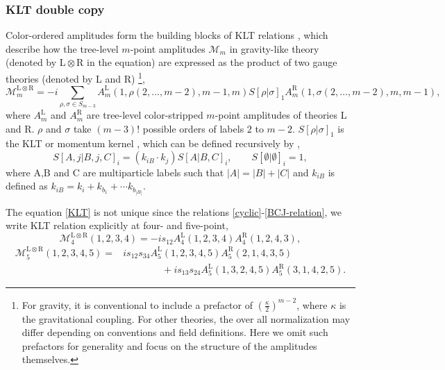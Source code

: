 \documentclass[a4paper,11pt]{article}
\begin{document}
\subsubsection{KLT double copy}
Color-ordered amplitudes form the building blocks of KLT relations \cite{Kawai:1985xq},
which describe how the tree-level $m$-point amplitudes $\mathcal{M}_m$  in gravity-like theory (denoted by $\mathrm L\otimes \mathrm R$ in the equation) are expressed as 
the product of two gauge theories (denoted by L and R)
\footnote{For gravity, it is conventional to include a prefactor of $\left(\frac{\kappa}{2}\right)^{m-2}$, where $\kappa$ is the gravitational coupling. For other theories, the over all normalization may differ depending on conventions and field definitions. 
Here we omit such prefactors for generality and focus on the structure of the amplitudes themselves.}\cite{Bern:1998sv},
\begin{equation}\label{KLT}
    \mathcal{M}_m^{\mathrm{L\otimes R}}=-i\sum_{\rho,\sigma\in S_{m-3}}A_m^{\mathrm L}(1,\rho(2,...,m-2),m-1,m)S[\rho|\sigma]_1 A^{\mathrm R}_m(1,\sigma(2,\dots,m-2),m,m-1),
\end{equation}
where $A^{\mathrm L}_m$ and $A^{\mathrm R}_m$ are tree-level color-stripped $m$-point amplitudes of theories L and R. $\rho$ and $\sigma$ take $(m-3)!$ possible orders of labels $2$ to $m-2$. 
$S[\rho|\sigma]_1$ is the KLT or momentum kernel \cite{Bern:1998sv}, which can be defined recursively by \cite{Carrasco:2016ldy},
\begin{equation}\label{S-kernel}
    S[A,j|B,j,C]_i=(k_{iB}\cdot k_j)S[A|B,C]_i,\qquad S[\emptyset|\emptyset]_i=1,
\end{equation}
where A,B and C are multiparticle labels such that $|A|=|B|+|C|$ and $k_{iB}$ is defined as $k_{iB}=k_i+k_{b_1}+\cdots k_{b_{|B|}}$.\par
The equation \eqref{KLT} is not unique since the relations \eqref{cyclic}-\eqref{BCJ-relation}, we write KLT relation explicitly at four- and five-point,
\begin{equation}
    \mathcal{M}^{\mathrm{L\otimes R}}_4(1,2,3,4)=-is_{12}A^{\mathrm L}_4(1,2,3,4)A^{\mathrm R}_4(1,2,4,3),
\end{equation}
\begin{equation}
    \begin{split}
    \mathcal{M}^{\mathrm{L\otimes R}}_5(1,2,3,4,5)=&is_{12}s_{34}A^{\mathrm L}_5(1,2,3,4,5)A^{\mathrm R}_5(2,1,4,3,5)\\
        &\qquad\qquad+is_{13}s_{24}A_5^{\mathrm L}(1,3,2,4,5)A^{\mathrm R}_5(3,1,4,2,5).
    \end{split}
\end{equation}\par
\end{document}
